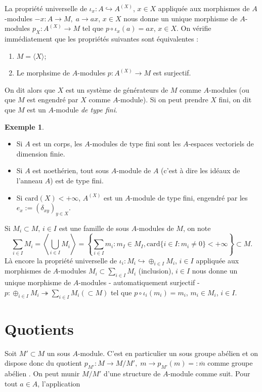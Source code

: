 \documentclass[a4paper, oneside, 12pt]{book}
\theoremstyle{theoremeStyle} %
\theoremstyle{definition} %
\newtheorem{exemple}[theoreme]{Exemple}
\begin{document}
La propriété universelle de $\iota_x:A\hookrightarrow A^{(X)}$, $x\in X$ appliquée aux morphismes  de $A$-modules $- x: A\rightarrow M,\; a\rightarrow a  x$, $x\in X$ nous donne un unique morphisme de $A$-modules  $p_X:A^{(X)}\rightarrow M$ tel que $p\circ \iota_x(a)=ax$, $x\in X$. On vérifie immédiatement que les propriétés suivantes sont équivalentes :

\begin{enumerate}
\item  $M=\langle X\rangle$;
\item Le morphsime de $A$-modules $p:A^{(X)}\rightarrow M$ est surjectif.
\end{enumerate}
On dit alors que $X$ est un système de générateurs de $M$ comme $A$-modules (ou que $M$ est engendré par $X$ comme $A$-module).   Si on peut prendre $X$ fini, on dit que $M$ est un $A$-module \textit{de type fini}.\\

\begin{exemple}
	\begin{itemize}
		\item Si $A$ est un corps, les $A$-modules de type fini sont les $A$-espaces vectoriels de dimension finie.
		\item Si $A$ est noethérien, tout sous $A$-module de $A$ (c'est à dire les idéaux de l'anneau $A$) est de type fini.
		\item Si $\mathrm{card}(X) <+\infty$, $A^{(X)}$ est un $A$-module de type fini, engendré par les $e_x := (\delta_{xy})_{y\in X}$.
	\end{itemize}
\end{exemple}

 Si $M_{i}\subset M$, $i\in I$ est une famille de sous $A$-modules de $M$, on note $$\sum_{i\in I}M_{i}=\left\langle \bigcup_{i\in I}M_{i}\right\rangle = \left\{ \sum_{i\in I} m_i : m_I \in M_I, \mathrm{card}\{i \in I : m_i\neq 0\}<+\infty\right\}\subset M.$$
Là encore la propriété universelle de $\iota_i:M_i\hookrightarrow \oplus_{i\in I}M_i$, $i\in I$ appliquée aux morphismes  de $A$-modules $M_i\subset \sum_{i\in I}M_i$ (inclusion), $i\in I$ nous donne un unique morphisme de $A$-modules - automatiquement surjectif - $p:\oplus_{i\in I}M_i\twoheadrightarrow \sum_{i\in I}M_i(\subset M)$ tel que $p\circ \iota_i(m_i)=m_i$, $m_i\in M_i$, $i\in I$.

\section{Quotients}
Soit $M'\subset M$ un sous $A$-module. C'est en particulier un sous groupe abélien et on dispose donc du quotient $p_{M'}: M\rightarrow M/M',\; m\rightarrow p_{M'}(m)=:\overline{m}$ comme groupe  abélien . On peut munir $M/M'$ d'une structure de $A$-module comme suit. Pour tout $a\in A$, l'application
\end{document}
